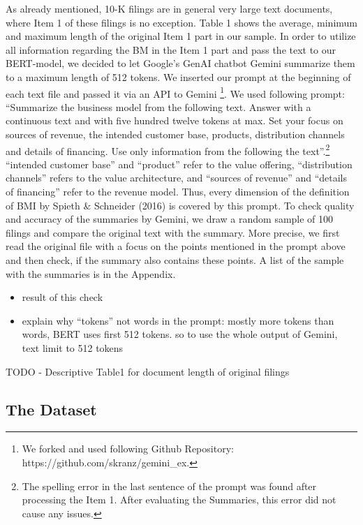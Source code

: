 \documentclass[
]{article}
\providecommand{\tightlist}{%
  \setlength{\itemsep}{0pt}\setlength{\parskip}{0pt}}\usepackage{longtable,booktabs,array}
\begin{document}
As already mentioned, 10-K filings are in general very large text
documents, where Item 1 of these filings is no exception. Table 1 shows
the average, minimum and maximum length of the original Item 1 part in
our sample. In order to utilize all information regarding the BM in the
Item 1 part and pass the text to our BERT-model, we decided to let
Google's GenAI chatbot Gemini summarize them to a maximum length of 512
tokens. We inserted our prompt at the beginning of each text file and
passed it via an API to Gemini \footnote{We forked and used following
  Github Repository: https://github.com/skranz/gemini\_ex.}. We used
following prompt: ``Summarize the business model from the following
text. Answer with a continuous text and with five hundred twelve tokens
at max. Set your focus on sources of revenue, the intended customer
base, products, distribution channels and details of financing. Use only
information from the following the text''.\footnote{The spelling error
  in the last sentence of the prompt was found after processing the Item
  1. After evaluating the Summaries, this error did not cause any
  issues.} ``intended customer base'' and ``product'' refer to the value
offering, ``distribution channels'' refers to the value architecture,
and ``sources of revenue'' and ``details of financing'' refer to the
revenue model. Thus, every dimension of the definition of BMI by Spieth
\& Schneider (2016) is covered by this prompt. To check quality and
accuracy of the summaries by Gemini, we draw a random sample of 100
filings and compare the original text with the summary. More precise, we
first read the original file with a focus on the points mentioned in the
prompt above and then check, if the summary also contains these points.
A list of the sample with the summaries is in the Appendix.

\begin{itemize}
\tightlist
\item
  result of this check
\item
  explain why ``tokens'' not words in the prompt: mostly more tokens
  than words, BERT uses first 512 tokens. so to use the whole output of
  Gemini, text limit to 512 tokens
\end{itemize}

TODO - Descriptive Table1 for document length of original filings

\subsection{The Dataset}\label{the-dataset}
\end{document}
